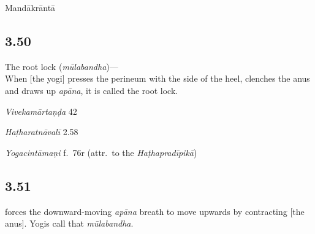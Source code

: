 \begin{ekdosis}
\begin{philcomm}[hp03_049_2]
\end{philcomm}

\begin{metre}[hp03_049_2]
Mandākrāntā 
\end{metre}

\subsection*{3.50}
\begin{translation}[hp03_050]
The root lock (\emph{mūlabandha})—\\
When [the yogi] presses the perineum with the side of the heel, clenches the anus and draws up \emph{apāna}, it is called the root lock.
\end{translation}

\begin{sources}[hp03_050]
\emph{Vivekamārtaṇḍa} 42
\begin{versinnote}
\end{versinnote}
\end{sources}

\begin{testimonia}[hp03_050]
\emph{Haṭharatnāvalī} 2.58
\begin{versinnote}
\end{versinnote}

\emph{Yogacintāmaṇi} f.~76r (attr.~to the \emph{Haṭhapradīpikā})
\begin{versinnote}
\end{versinnote}

\end{testimonia}


\subsection*{3.51}
\begin{translation} forces the downward-moving \emph{apāna} breath to move upwards by contracting [the anus]. Yogis call that \emph{mūlabandha}.
\end{translation}


\end{ekdosis}
